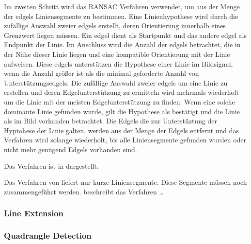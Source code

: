 Im zweiten Schritt wird das RANSAC Verfahren verwendet, um aus der Menge der \gls{edgels} Liniensegmente zu bestimmen. Eine Linienhypothese wird durch die zufällige Auswahl zweier \gls{edgels} erstellt, deren Orientierung innerhalb eines Grenzwert liegen müssen. Ein edgel dient als Startpunkt und das andere edgel als Endpunkt der Linie. Im Anschluss wird die Anzahl der \gls{edgels} betrachtet, die in der Nähe dieser Linie liegen und eine kompatible Orientierung mit der Linie aufweisen. Diese \gls{edgels} unterstützen die Hypothese einer Linie im Bildsignal, wenn die Anzahl größer ist als die minimal geforderte Anzahl von Unterstützungsedgels. Die zufällige Auswahl zweier \gls{edgels} um eine Linie zu erstellen und deren Edgelunterstützung zu ermitteln wird mehrmals wiederholt um die Linie mit der meisten Edgelunterstützung zu finden. Wenn eine solche dominante Linie gefunden wurde, gilt die Hypothese als bestätigt und die Linie als im Bild vorhanden betrachtet. Die Edgels die zur Unterstüztung der Hyptohese der Linie galten, werden aus der Menge der Edgels entfernt und das Verfahren wird solange wiederholt, bis alle Liniensegmente gefunden wurden oder nicht mehr genügend Edgels vorhanden sind.

Das Verfahren ist in  dargestellt.



Das Verfahren von \citeauthor{clarke96} liefert nur kurze Liniensegmente. Diese Segmente müssen noch zusammengeführt werden. \citeauthor{hirzer08} beschreibt das Verfahren \dots

\subsubsection{Line Extension} %
\label{sub:line_extension}

\subsubsection{Quadrangle Detection} %
\label{sub:quadrangle_detection}

